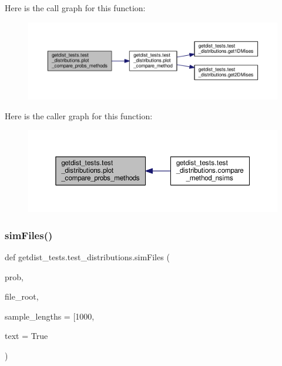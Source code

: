 Here is the call graph for this function\+:
\nopagebreak
\begin{figure}[H]
\begin{center}
\leavevmode
\includegraphics[width=350pt]{namespacegetdist__tests_1_1test__distributions_a39af2372626f003d30a4b041de34f700_cgraph}
\end{center}
\end{figure}
Here is the caller graph for this function\+:
\nopagebreak
\begin{figure}[H]
\begin{center}
\leavevmode
\includegraphics[width=350pt]{namespacegetdist__tests_1_1test__distributions_a39af2372626f003d30a4b041de34f700_icgraph}
\end{center}
\end{figure}
\mbox{\label{namespacegetdist__tests_1_1test__distributions_a67a512c46fba1d2a8de61258145201a8}} 
\subsubsection{\texorpdfstring{sim\+Files()}{simFiles()}}
{\footnotesize\ttfamily def getdist\+\_\+tests.\+test\+\_\+distributions.\+sim\+Files (\begin{DoxyParamCaption}\item[{}]{prob,  }\item[{}]{file\+\_\+root,  }\item[{}]{sample\+\_\+lengths = {\ttfamily \mbox{[}1000},  }\item[{}]{text = {\ttfamily True} }\end{DoxyParamCaption})}


